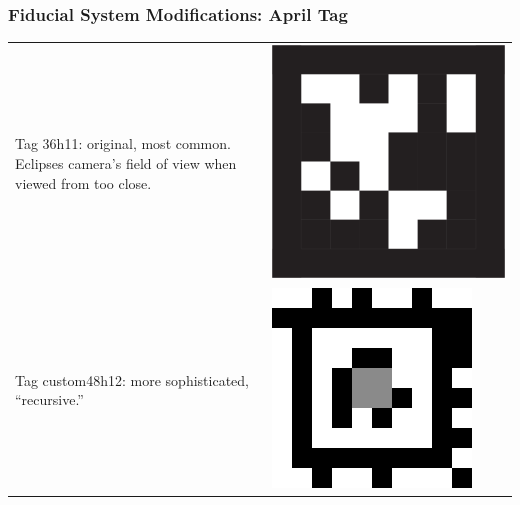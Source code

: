 \documentclass[aspectratio=169]{rubeamer}
\begin{document}
\begin{frame}
  \frametitle{Fiducial System Modifications: April Tag}
  \centering
  \begin{tabular}{m{}m{}}
    Tag 36h11: original, most common. Eclipses camera's field of view when viewed from too close. & \includegraphics[width=\linewidth]{tag_36h11_borderless}\\
    Tag custom48h12: more sophisticated, ``recursive.'' & \includegraphics[width=\linewidth]{tag48_12_00000}
  \end{tabular}
\end{frame}
\end{document}
